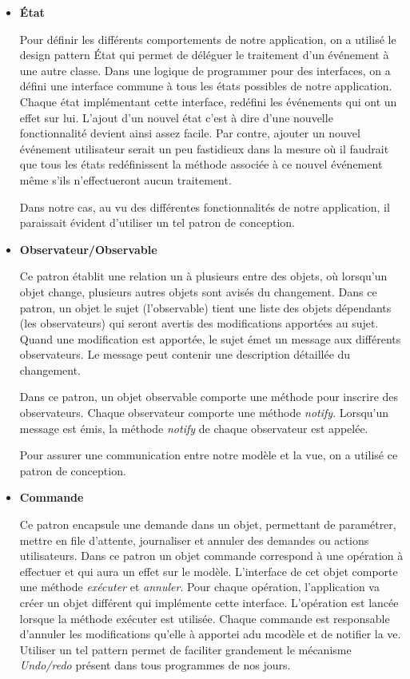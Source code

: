 \documentclass[10pt,a4paper]{book}
\begin{document}
\begin{itemize}
\item{\textbf{État}} 
	
Pour définir les différents comportements de notre application, on a utilisé le design pattern État qui permet de déléguer le traitement d'un événement à une autre classe. Dans une logique de programmer pour des interfaces, on a défini une interface commune à tous les états possibles de notre application. Chaque état implémentant cette interface, redéfini les événements qui ont un effet sur lui. L'ajout d'un nouvel état c'est à dire d'une nouvelle fonctionnalité devient ainsi assez facile. Par contre, ajouter un nouvel événement utilisateur serait un peu fastidieux dans la mesure où il faudrait que tous les états redéfinissent la méthode associée à ce nouvel événement même s'ils n'effectueront aucun traitement.

Dans notre cas, au vu des différentes fonctionnalités de notre application, il paraissait évident d'utiliser un tel patron de conception.	


\item \textbf{Observateur/Observable}
	
Ce patron établit une relation un à plusieurs entre des objets, où lorsqu'un objet change, plusieurs autres objets sont avisés du changement. Dans ce patron, un objet le sujet (l'observable) tient une liste des objets dépendants (les observateurs) qui seront avertis des modifications apportées au sujet. Quand une modification est apportée, le sujet émet un message aux différents observateurs. Le message peut contenir une description détaillée du changement. 

Dans ce patron, un objet observable comporte une méthode pour inscrire des observateurs. Chaque observateur comporte une méthode \textit{notify}. Lorsqu'un message est émis,  la méthode \textit{notify} de chaque observateur est appelée.

Pour assurer une communication entre notre modèle et la vue, on a utilisé ce patron de conception.

\item \textbf{Commande}

Ce patron encapsule une demande dans un objet, permettant de paramétrer, mettre en file d'attente, journaliser et annuler des demandes ou actions utilisateurs. Dans ce patron un objet commande correspond à une opération à effectuer et qui aura un effet sur le modèle. L'interface de cet objet comporte une méthode \textit{exécuter} et \textit{annuler}. Pour chaque opération, l'application va créer un objet différent qui implémente cette interface. L'opération est lancée lorsque la méthode exécuter est utilisée. Chaque commande est responsable d'annuler les modifications qu'elle à apportei adu mcodèle et de notifier la ve.  Utiliser un tel pattern permet de faciliter grandement le mécanisme \textit{Undo/redo} présent dans tous programmes de nos jours.


\end{itemize}
\end{document}
